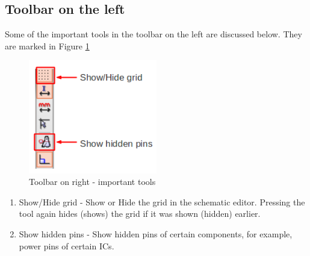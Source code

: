 \subsection{Toolbar on the left}
Some of the important tools in the toolbar on the left are discussed below. They are marked in Figure \ref{eeschem4}
\begin{figure}
\centering
\includegraphics[width=0.5\textwidth]{figures/eeschema4_mod}
\caption{Toolbar on right - important tools}
\label{eeschem4}
\end{figure}

\begin{enumerate}
\item Show/Hide grid - Show or Hide the grid in the schematic editor. Pressing the tool again hides (shows) the grid if it was shown (hidden) earlier.
\item Show hidden pins - Show hidden pins of certain components, for  example, power pins of certain ICs. 
\end{enumerate}

